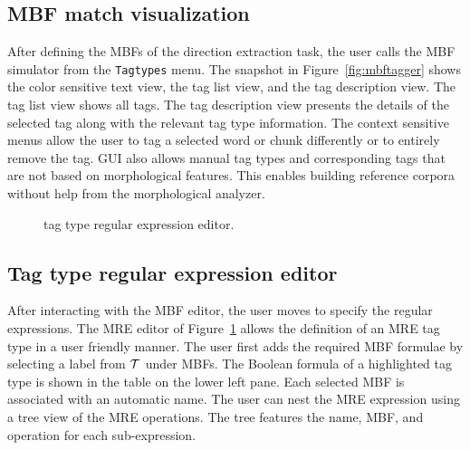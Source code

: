 \subsection{MBF match visualization}

After defining the MBFs of the direction extraction task, 
the user calls the MBF simulator from the {\tt Tagtypes} menu. 
The snapshot in Figure~\ref{fig:mbftagger} shows 
the color sensitive text view, the tag list view, and the tag description view. 
The tag list view shows all tags.
The tag description view presents the details of the selected tag along with 
the relevant tag type information.
%
The context sensitive menus allow the user to tag 
a selected word or chunk differently or to entirely remove the tag. 
\framework GUI also allows manual tag types and corresponding tags 
that are not based on morphological features.
This enables building reference corpora without 
help from the morphological analyzer.


\begin{figure}[t]
  \centering
  {\setlength{\fboxsep}{0pt}%
  \setlength{\fboxrule}{0.5pt}%
  }
  \caption{\framework tag type regular expression editor.}
  \label{f:sfe}
\end{figure}

\subsection{Tag type regular expression editor}

After interacting with the MBF editor, the user moves to 
specify the regular expressions. 
The MRE editor of Figure~\ref{f:sfe} allows the 
definition of an MRE tag type in a user friendly manner. 
The user first adds the required MBF formulae 
by selecting a label from ${\cal T}$ under MBFs. 
The Boolean formula of a highlighted tag type is shown in the table on the lower left pane. 
Each selected MBF is associated with an automatic name. 
The user can nest the MRE expression using a tree view of the MRE operations. 
The tree features the name, MBF, and operation for each sub-expression. 

